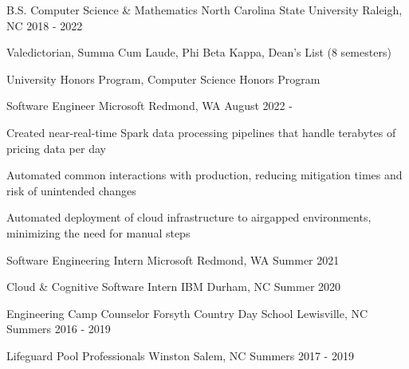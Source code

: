 \documentclass[a4paper]{awesome-cv}
\begin{document}
	
	\makecvheader[C]
	
	
	\begin{cventries}
		\cventry
		{B.S. Computer Science \& Mathematics}		%
		{North Carolina State University} 			%
		{Raleigh, NC} 								%
		{2018 - 2022} 								%
		{
			\begin{cvitems}
				\item {Valedictorian, Summa Cum Laude, Phi Beta Kappa, Dean's List (8 semesters)}
				\item {University Honors Program, Computer Science Honors Program}
			\end{cvitems}
		}
	\end{cventries}

	\cvsection{Experience}
	\begin{cventries}
		\cventry
		{Software Engineer}	%
		{Microsoft} 		%
		{Redmond, WA} 		%
		{August 2022 -} 	%
		{
			\begin{cvitems} %
				\item {Created near-real-time Spark data processing pipelines that handle terabytes of pricing data per day}
				\item {Automated common interactions with production, reducing mitigation times and risk of unintended changes}
				\item {Automated deployment of cloud infrastructure to airgapped environments, minimizing the need for manual steps}
			\end{cvitems}
		}
	
		\cventry
		{Software Engineering Intern}	%
		{Microsoft} 					%
		{Redmond, WA} 					%
		{Summer 2021} 					%
		{}
	
		\cventry
		{Cloud \& Cognitive Software Intern}	%
		{IBM} 									%
		{Durham, NC} 							%
		{Summer 2020} 							%
		{}
	
		\cventry
		{Engineering Camp Counselor}	%
		{Forsyth Country Day School} 	%
		{Lewisville, NC} 				%
		{Summers 2016 - 2019} 			%
		{}
		
		\cventry
		{Lifeguard} 			%
		{Pool Professionals}	%
		{Winston Salem, NC} 	%
		{Summers 2017 - 2019} 	%
		{}
	\end{cventries}
	
\end{document}
